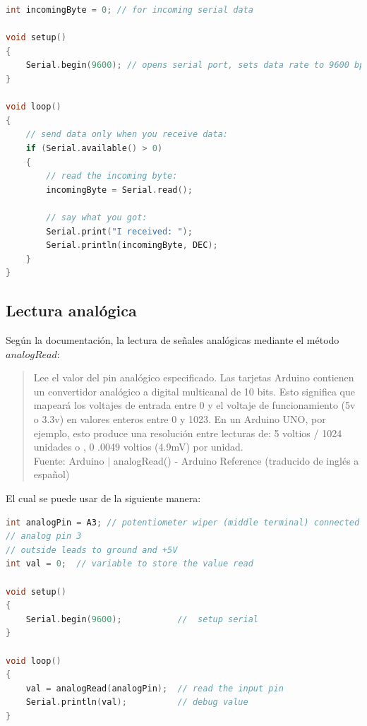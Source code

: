 \documentclass{article}
\begin{document}
\begin{lstlisting}[language=C, caption=Uso del método read. \footnotesize
Fuente: Serial - Arduino Reference (read) \cite{arduino-serial}]
int incomingByte = 0; // for incoming serial data

void setup()
{
    Serial.begin(9600); // opens serial port, sets data rate to 9600 bps
}

void loop()
{
    // send data only when you receive data:
    if (Serial.available() > 0)
    {
        // read the incoming byte:
        incomingByte = Serial.read();

        // say what you got:
        Serial.print("I received: ");
        Serial.println(incomingByte, DEC);
    }
}
\end{lstlisting}

\subsection{Lectura analógica}

Según la documentación, la lectura de señales analógicas mediante el método
$analogRead$:

\begin{quote}
Lee el valor del pin analógico especificado. Las tarjetas Arduino contienen
un convertidor analógico a digital multicanal de 10 bits. Esto significa que
mapeará los voltajes de entrada entre 0 y el voltaje de funcionamiento (5v o
3.3v) en valores enteros entre 0 y 1023. En un Arduino UNO, por ejemplo, esto
produce una resolución entre lecturas de: 5 voltios / 1024 unidades o , 0
.0049 voltios (4.9mV) por unidad. \\ \footnotesize
Fuente: Arduino $\mid$ analogRead() - Arduino Reference (traducido de inglés
a español) \cite{arduino-analogRead}
\end{quote}

El cual se puede usar de la siguiente manera:

\begin{lstlisting}[language=C, caption=Uso del método analogRead.
\footnotesize Fuente: analogRead() - Arduino Reference
\cite{arduino-analogRead}]
int analogPin = A3; // potentiometer wiper (middle terminal) connected to
// analog pin 3
// outside leads to ground and +5V
int val = 0;  // variable to store the value read

void setup()
{
    Serial.begin(9600);           //  setup serial
}

void loop()
{
    val = analogRead(analogPin);  // read the input pin
    Serial.println(val);          // debug value
}
\end{lstlisting}
\end{document}
